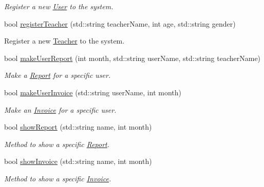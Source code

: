 \begin{DoxyCompactItemize}
\begin{DoxyCompactList}\small\item\em Register a new \mbox{\hyperlink{class_user}{User}} to the system. \end{DoxyCompactList}\item 
bool \mbox{\hyperlink{class_company_afd7f0c326672c6bb6a23d5921503bc0d}{register\+Teacher}} (std\+::string teacher\+Name, int age, std\+::string gender)
\begin{DoxyCompactList}\small\item\em 
\begin{DoxyItemize}
\item Register a new \mbox{\hyperlink{class_teacher}{Teacher}} to the system. 
\end{DoxyItemize}\end{DoxyCompactList}\item 
bool \mbox{\hyperlink{class_company_acc2aba7c2f4149021e9b93ab423e417b}{make\+User\+Report}} (int month, std\+::string user\+Name, std\+::string teacher\+Name)
\begin{DoxyCompactList}\small\item\em Make a \mbox{\hyperlink{class_report}{Report}} for a specific user. \end{DoxyCompactList}\item 
bool \mbox{\hyperlink{class_company_a955b07492e04edd5ed83f695ee362ab4}{make\+User\+Invoice}} (std\+::string user\+Name, int month)
\begin{DoxyCompactList}\small\item\em Make an \mbox{\hyperlink{class_invoice}{Invoice}} for a specific user. \end{DoxyCompactList}\item 
bool \mbox{\hyperlink{class_company_a2c00c88b245aef0e0e52864b585f8f6b}{show\+Report}} (std\+::string name, int month)
\begin{DoxyCompactList}\small\item\em Method to show a specific \mbox{\hyperlink{class_report}{Report}}. \end{DoxyCompactList}\item 
bool \mbox{\hyperlink{class_company_ad3d0ab0209f13ca48a83df34564ef055}{show\+Invoice}} (std\+::string name, int month)
\begin{DoxyCompactList}\small\item\em Method to show a specific \mbox{\hyperlink{class_invoice}{Invoice}}. \end{DoxyCompactList}\item 

\end{DoxyCompactItemize}
